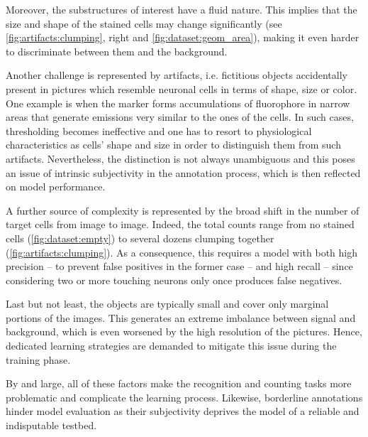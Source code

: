 Moreover, the substructures of interest have a fluid nature. This implies that the size and shape of the stained cells may change significantly (see \cref{fig:artifacts:clumping}, right and \cref{fig:dataset:geom_area}), making it even harder to discriminate between them and the background.

Another challenge is represented by artifacts, i.e. fictitious objects accidentally present in pictures which resemble neuronal cells in terms of shape, size or color.
One example is when the marker forms accumulations of fluorophore in narrow areas that generate emissions very similar to the ones of the cells. In such cases, thresholding becomes ineffective and one has to resort to physiological characteristics as cells' shape and size in order to distinguish them from such artifacts.
Nevertheless, the distinction is not always unambiguous and this poses an issue of intrinsic subjectivity in the annotation process, which is then reflected on model performance.

A further source of complexity is represented by the broad shift in the number of target cells from image to image.
Indeed, the total counts range from no stained cells (\cref{fig:dataset:empty}) to several dozens clumping together (\cref{fig:artifacts:clumping}). 
As a consequence, this requires a model with both high precision -- to prevent false positives in the former case -- and high recall -- since considering two or more touching neurons only once produces false negatives.

Last but not least, the objects are typically small and cover only marginal portions of the images. This generates an extreme imbalance between signal and background, which is even worsened by the high resolution of the pictures.
Hence, dedicated learning strategies are demanded to mitigate this issue during the training phase.

By and large, all of these factors make the recognition and counting tasks more problematic and complicate the learning process.
Likewise, borderline annotations hinder model evaluation as their subjectivity deprives the model of a reliable and indisputable testbed.